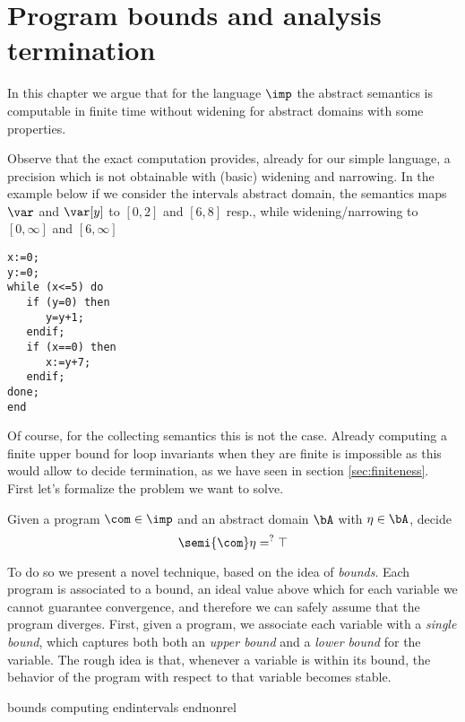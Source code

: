 \chapter{Program bounds and analysis termination}
\label{chap:axiomatized}


In this chapter we argue that for the language \(\imp\) the abstract
semantics is computable in finite time without widening for abstract
domains with some properties.

Observe that the exact computation provides, already for our simple
language, a precision which is not obtainable with (basic) widening
and narrowing. In the example below if we consider the intervals
abstract domain, the semantics maps \(\var\) and \(\var[y]\) to
\([0,2]\) and \([6,8]\) resp., while widening/narrowing to
\([0,\infty]\) and \([6,\infty]\)

\begin{verbatim}
x:=0;
y:=0;
while (x<=5) do
   if (y=0) then
      y=y+1;
   endif;
   if (x==0) then
      x:=y+7;
   endif;
done;
end
\end{verbatim}

Of course, for the collecting semantics this is not the case. Already
computing a finite upper bound for loop invariants when they are
finite is impossible as this would allow to decide termination, as we
have seen in section \ref{sec:finiteness}. First let's formalize the
problem we want to solve.

\begin{problem}\label{problem1}
  Given a program \(\com\in \imp\) and an abstract domain \(\bA\) with
  \(\eta \in \bA\), decide
  \begin{equation*}
    \semi{\com} \eta =^? \top
  \end{equation*}
\end{problem}

To do so we present a novel technique, based on the idea of
\emph{bounds}. Each program is associated to a bound, an ideal value
above which for each variable we cannot guarantee convergence, and
therefore we can safely assume that the program diverges.  First,
given a program, we associate each variable with a \emph{single
  bound}, which captures both both an \emph{upper bound} and a
\emph{lower bound} for the variable. The rough idea is that, whenever
a variable is within its bound, the behavior of the program with
respect to that variable becomes stable. %

{bounds}
{computing}
{endintervals}
{endnonrel}